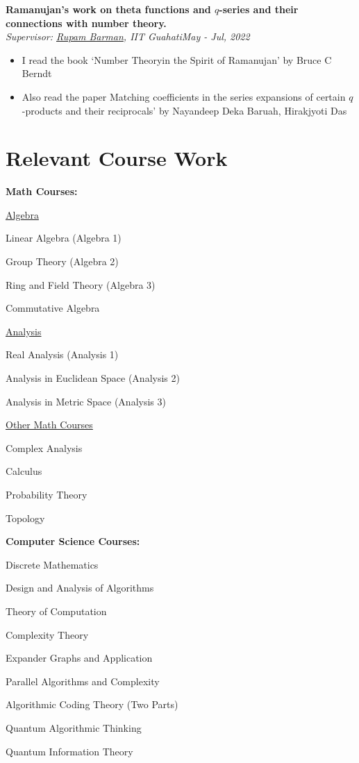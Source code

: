 \documentclass[letterpaper,10pt]{article}
\newcommand{\heading}[2]{
  \hspace{10pt}#1\hfill#2\\
}
\newcommand{\headingBf}[2]{
  \heading{\textbf{#1}}{\textbf{#2}}
}
\newcommand{\headingIt}[2]{
  \heading{\textit{#1}}{\textit{#2}}
}
\newenvironment{resume_list}{
  \vspace{-7pt}
  \begin{itemize}[itemsep=-2px, parsep=1pt, leftmargin=30pt]
}{
  \end{itemize}
}
\newcommand{\itemTitle}[1]{
  \item[] \underline{#1}\vspace{4pt}
}
\begin{document}
\begin{resume_list}
\item \headingBf{Ramanujan’s work on theta functions and $q$-series and their connections with number theory.}{}
\headingIt{Supervisor: \href{https://www.iitg.ac.in/rupam/}{Rupam Barman}, IIT Guahati}{May - Jul, 2022}
\begin{itemize}
	\item I read the book `Number Theoryin the Spirit of Ramanujan' by Bruce C Berndt
	\item Also read the paper Matching coefficients in the series expansions of certain \(q\)-products and their reciprocals' by Nayandeep Deka Baruah, Hirakjyoti Das
\end{itemize}
\end{resume_list}

\section{Relevant Course Work}

\headingBf{Math Courses:}{}
\begin{resume_list}
	\itemTitle{Algebra}
	\item Linear Algebra (Algebra 1)
	\item Group Theory (Algebra 2)
	\item Ring and  Field Theory (Algebra 3)
	\item Commutative Algebra
	\itemTitle{Analysis}
	\item Real Analysis (Analysis 1)
	\item Analysis in Euclidean Space (Analysis 2)
	\item Analysis in Metric Space (Analysis 3)
	\vspace{3pt}
	\itemTitle{Other Math Courses}
	\item Complex Analysis
	\item Calculus
	\item Probability Theory
	\item Topology
\end{resume_list}

\headingBf{Computer Science Courses:}{}
\begin{resume_list}
	\item Discrete Mathematics
	\item  Design and Analysis of Algorithms
	\item  Theory of Computation
	\item Complexity Theory
	\item  Expander Graphs and Application
	\item Parallel Algorithms and Complexity
	\item  Algorithmic Coding Theory (Two Parts)
	\item  Quantum Algorithmic Thinking
	\item  Quantum Information Theory
\end{resume_list}
\end{document}
